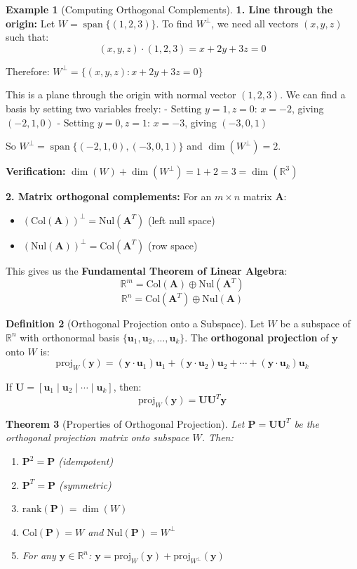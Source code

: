 \documentclass[12pt]{article}
\numberwithin{equation}{section}
\newcommand{\vect}[1]{\boldsymbol{#1}}   %
\newcommand{\mat}[1]{\mathbf{#1}}        %
\newcommand{\Span}{\operatorname{span}}
\theoremstyle{plain}
\newtheorem{theorem}{Theorem}[section]
\theoremstyle{definition}
\newtheorem{definition}[theorem]{Definition}
\newtheorem{example}[theorem]{Example}
\theoremstyle{remark}
\begin{document}
\begin{example}[Computing Orthogonal Complements]
\textbf{1. Line through the origin:}
Let $W = \Span\{(1, 2, 3)\}$. To find $W^{\perp}$, we need all vectors $(x, y, z)$ such that:
$$(x, y, z) \cdot (1, 2, 3) = x + 2y + 3z = 0$$

Therefore: $W^{\perp} = \{(x, y, z) : x + 2y + 3z = 0\}$

This is a plane through the origin with normal vector $(1, 2, 3)$. We can find a basis by setting two variables freely:
- Setting $y = 1, z = 0$: $x = -2$, giving $(-2, 1, 0)$
- Setting $y = 0, z = 1$: $x = -3$, giving $(-3, 0, 1)$

So $W^{\perp} = \Span\{(-2, 1, 0), (-3, 0, 1)\}$ and $\dim(W^{\perp}) = 2$.

\textbf{Verification:} $\dim(W) + \dim(W^{\perp}) = 1 + 2 = 3 = \dim(\mathbb{R}^3)$ \checkmark

\textbf{2. Matrix orthogonal complements:}
For an $m \times n$ matrix $\mat{A}$:
\begin{itemize}
\item $(\text{Col}(\mat{A}))^{\perp} = \text{Nul}(\mat{A}^T)$ (left null space)
\item $(\text{Nul}(\mat{A}))^{\perp} = \text{Col}(\mat{A}^T)$ (row space)
\end{itemize}

This gives us the \textbf{Fundamental Theorem of Linear Algebra}:
$$\mathbb{R}^m = \text{Col}(\mat{A}) \oplus \text{Nul}(\mat{A}^T)$$
$$\mathbb{R}^n = \text{Col}(\mat{A}^T) \oplus \text{Nul}(\mat{A})$$
\end{example}

\begin{definition}[Orthogonal Projection onto a Subspace]
Let $W$ be a subspace of $\mathbb{R}^n$ with orthonormal basis $\{\vect{u}_1, \vect{u}_2, \ldots, \vect{u}_k\}$. The \textbf{orthogonal projection} of $\vect{y}$ onto $W$ is:
$$\text{proj}_W(\vect{y}) = (\vect{y} \cdot \vect{u}_1)\vect{u}_1 + (\vect{y} \cdot \vect{u}_2)\vect{u}_2 + \cdots + (\vect{y} \cdot \vect{u}_k)\vect{u}_k$$

If $\mat{U} = [\vect{u}_1 \mid \vect{u}_2 \mid \cdots \mid \vect{u}_k]$, then:
$$\text{proj}_W(\vect{y}) = \mat{U}\mat{U}^T\vect{y}$$
\end{definition}

\begin{theorem}[Properties of Orthogonal Projection]
Let $\mat{P} = \mat{U}\mat{U}^T$ be the orthogonal projection matrix onto subspace $W$. Then:
\begin{enumerate}
\item $\mat{P}^2 = \mat{P}$ (idempotent)
\item $\mat{P}^T = \mat{P}$ (symmetric)
\item $\text{rank}(\mat{P}) = \dim(W)$
\item $\text{Col}(\mat{P}) = W$ and $\text{Nul}(\mat{P}) = W^{\perp}$
\item For any $\vect{y} \in \mathbb{R}^n$: $\vect{y} = \text{proj}_W(\vect{y}) + \text{proj}_{W^{\perp}}(\vect{y})$
\end{enumerate}
\end{theorem}
\end{document}
